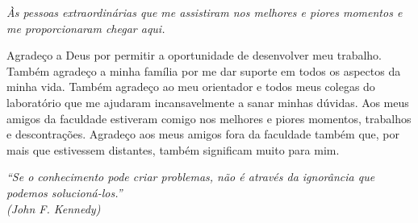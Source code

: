 \documentclass[
	12pt,				%
	openright,			%
	oneside,			%
	a4paper,			%
	english,			%
	brazil				%
	]{abntex2}
\begin{document}

\begin{dedicatoria}
  \vspace*{\fill}
  \centering
  \noindent
  \textit{Às pessoas extraordinárias que me assistiram nos melhores e piores momentos e me proporcionaram chegar aqui.} \vspace*{\fill}
\end{dedicatoria}

\begin{agradecimentos}
Agradeço a Deus por permitir a oportunidade de desenvolver meu trabalho. Também agradeço a minha família por me dar suporte em todos os aspectos da minha vida. Também agradeço ao meu orientador e todos meus colegas do laboratório que me ajudaram incansavelmente a sanar minhas dúvidas. Aos meus amigos da faculdade estiveram comigo nos melhores e piores momentos, trabalhos e descontrações. Agradeço aos meus amigos fora da faculdade também que, por mais que estivessem distantes, também significam muito para mim.

\end{agradecimentos}

\begin{epigrafe}
    \vspace*{\fill}
	\begin{flushright}
		\textit{``Se o conhecimento pode criar problemas, não é através da ignorância que podemos solucioná-los.''\\
		(John F. Kennedy)}
	\end{flushright}
\end{epigrafe}

\end{document}
